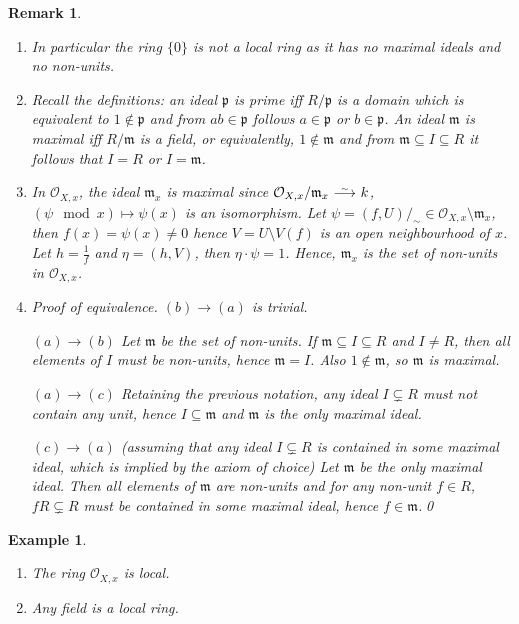 \documentclass[DIV=14,parskip=full,pointednumbers]{scrartcl}
\newenvironment{alphanumerate}{\begin{enumerate}[label={$(\alph*)$},ref=\curthm]}{\end{enumerate}}
\theoremstyle{cthm}
\theoremstyle{cvarthm}
\theoremstyle{cdef}
\newtheorem{example}{Example}[subsection]
\newtheorem{rem}{Remark}[subsection]
\newcommand{\Oo}{\mathcal{O}}
\newcommand{\mm}{\mathfrak{m}}
\newcommand{\pp}{\mathfrak{p}}
\newcommand{\isomorphism}{
	\tikz[baseline=(a.base)] \node (a) at (0,0) {$\longrightarrow$} node[above=-0.25ex] {\tiny $\sim$};}
\begin{document}
	\begin{rem}
	\begin{alphanumerate}
	\item 
		In particular the ring $\{0\}$ is not a local ring as it has no maximal ideals and no non-units.
	\item 
		Recall the definitions: an ideal $\pp$ is prime iff $R/\pp$ is a domain which is equivalent to $1\not\in \pp$ and from $ab\in \pp$ follows $a\in \pp$ or $b\in \pp$. An ideal $\mm$ is maximal iff $R/\mm$ is a field, or equivalently, $1\not\in \mm$ and from $\mm\subseteq I\subseteq R$ it follows that $I=R$ or $I=\mm$.
	\item
		 In $\Oo_{X,x}$, the ideal $\mm_x$ is maximal since $\Oo_{X,x}/\mm_x \isomorphism k$, $(\psi\mod x)\mapsto \psi(x)$ is an isomorphism. Let $\psi = (f,U)/_\sim\in \Oo_{X,x}\setminus \mm_x$, then $f(x) = \psi(x) \neq 0$ hence $V=U\setminus V(f)$ is an open neighbourhood of $x$. Let $h=\frac{1}{f}$ and $\eta = (h, V)$, then $\eta\cdot \psi = 1$. Hence, $\mm_x$ is the set of non-units in $\Oo_{X,x}$.
	\item 
		\emph{Proof of equivalence.} $(b)\to (a)$ is trivial.
		
		$(a)\to (b)$ Let $\mm$ be the set of non-units. If $\mm\subseteq I\subseteq R$ and $I\neq R$, then all elements of $I$ must be non-units, hence $\mm = I$. Also $1\not\in \mm$, so $\mm$ is maximal.
		
		$(a)\to (c)$ Retaining the previous notation, any ideal $I\subsetneq R$ must not contain any unit, hence $I\subseteq \mm$ and $\mm$ is the only maximal ideal.
		
		$(c) \to (a)$ (assuming that any ideal $I\subsetneq R$ is contained in some maximal ideal, which is implied by the axiom of choice) Let $\mm$ be the only maximal ideal. Then all elements of $\mm$ are non-units and for any non-unit $f\in R$, $fR\subsetneq R$ must be contained in some maximal ideal, hence $f\in\mm$.\qed
	
	\end{alphanumerate}
	\end{rem}
	\begin{example}
		\begin{alphanumerate}
		\item 
			The ring $\Oo_{X,x}$ is local.
		\item 
			Any field is a local ring.
		\end{alphanumerate}

	\end{example}
\end{document}
